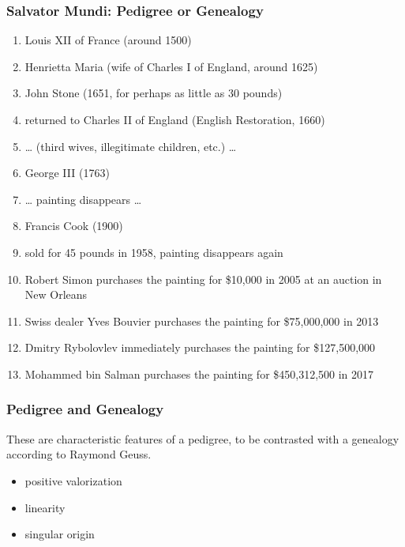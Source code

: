 \documentclass[xcolor=dvipsnames]{beamer}
\begin{document}
\begin{frame}
  \frametitle{Salvator Mundi: Pedigree or Genealogy}
  \begin{enumerate}
  \item Louis XII of France (around 1500)
  \item Henrietta Maria (wife of Charles I of England, around 1625)
  \item John Stone (1651, for perhaps as little as 30 pounds)
  \item returned to Charles II of England (English Restoration, 1660)
  \item {\ldots} (third wives, illegitimate children, etc.) {\ldots}
  \item George III (1763)
  \item {\ldots} painting disappears {\ldots}
  \item Francis Cook (1900)
  \item sold for 45 pounds in 1958, painting disappears again
  \item Robert Simon purchases the painting for \$10,000 in 2005 at an
    auction in New Orleans
  \item Swiss dealer Yves Bouvier purchases the painting for
    \$75,000,000 in 2013
  \item Dmitry Rybolovlev immediately purchases the painting for
    \$127,500,000
  \item Mohammed bin Salman purchases the painting for \$450,312,500
    in 2017
  \end{enumerate}
\end{frame}

\begin{frame}
  \frametitle{Pedigree and Genealogy}
  These are characteristic features of a pedigree, to be contrasted
  with a genealogy according to Raymond Geuss.
  \begin{itemize}
  \item positive valorization
  \item linearity
  \item singular origin
  \end{itemize}
\end{frame}
\end{document}
